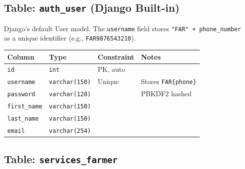 \documentclass[11pt,a4paper]{article}
\begin{document}
\subsection{Table: \texttt{auth\_user} (Django Built-in)}

Django's default User model. The \texttt{username} field stores \texttt{"FAR" + phone\_number} as a unique identifier (e.g., \texttt{FAR9876543210}).

\begin{table}[H]
\centering
\begin{tabularx}{\textwidth}{l l l X}
\toprule
\textbf{Column} & \textbf{Type} & \textbf{Constraint} & \textbf{Notes} \\
\midrule
\texttt{id}         & \texttt{int}          & PK, auto    & \\
\texttt{username}   & \texttt{varchar(150)} & Unique      & Stores \texttt{FAR\{phone\}} \\
\texttt{password}   & \texttt{varchar(128)} &             & PBKDF2 hashed \\
\texttt{first\_name} & \texttt{varchar(150)} &             & \\
\texttt{last\_name}  & \texttt{varchar(150)} &             & \\
\texttt{email}      & \texttt{varchar(254)} &             & \\
\bottomrule
\end{tabularx}
\end{table}

\subsection{Table: \texttt{services\_farmer}}
\end{document}
